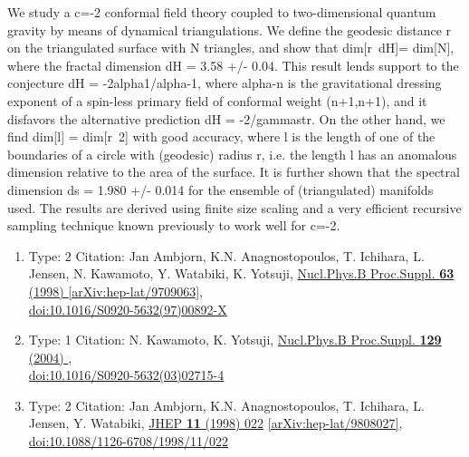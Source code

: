 \documentclass[a4paper,10pt]{article}
\begin{document}
\begin{enumerate}
We study a c=-2 conformal field theory coupled to two-dimensional quantum gravity by means of dynamical triangulations. We define the geodesic distance r on the triangulated surface with N triangles, and show that dim[r~{dH}]= dim[N], where the fractal dimension dH = 3.58 +/- 0.04. This result lends support to the conjecture dH = -2alpha1/alpha{-1}, where alpha{-n} is the gravitational dressing exponent of a spin-less primary field of conformal weight (n+1,n+1), and it disfavors the alternative prediction dH = -2/gamma{str}. On the other hand, we find dim[l] = dim[r~2] with good accuracy, where l is the length of one of the boundaries of a circle with (geodesic) radius r, i.e. the length l has an anomalous dimension relative to the area of the surface. It is further shown that the spectral dimension ds = 1.980 +/- 0.014 for the ensemble of (triangulated) manifolds used. The results are derived using finite size scaling and a very efficient recursive sampling technique known previously to work well for c=-2.
\begin{enumerate}
  \item Type: 2 Citation: Jan Ambjorn, K.N. Anagnostopoulos, T. Ichihara, L. Jensen, N. Kawamoto, Y. Watabiki, K. Yotsuji, \href{https://www.doi.org/10.1016/S0920-5632(97)00892-X}{Nucl.Phys.B Proc.Suppl. {\bf 63} (1998) }  \href{https://arxiv.org/abs/hep-lat/9709063}{[arXiv:hep-lat/9709063]},\\\href{https://www.doi.org/10.1016/S0920-5632(97)00892-X}{doi:10.1016/S0920-5632(97)00892-X}
  \item Type: 1 Citation: N. Kawamoto, K. Yotsuji, \href{https://www.doi.org/10.1016/S0920-5632(03)02715-4}{Nucl.Phys.B Proc.Suppl. {\bf 129} (2004) },\\\href{https://www.doi.org/10.1016/S0920-5632(03)02715-4}{doi:10.1016/S0920-5632(03)02715-4}
  \item Type: 2 Citation: Jan Ambjorn, K.N. Anagnostopoulos, T. Ichihara, L. Jensen, Y. Watabiki, \href{https://www.doi.org/10.1088/1126-6708/1998/11/022}{JHEP {\bf 11} (1998) 022}  \href{https://arxiv.org/abs/hep-lat/9808027}{[arXiv:hep-lat/9808027]},\\\href{https://www.doi.org/10.1088/1126-6708/1998/11/022}{doi:10.1088/1126-6708/1998/11/022}

\end{enumerate}
\end{enumerate}
\end{document}
